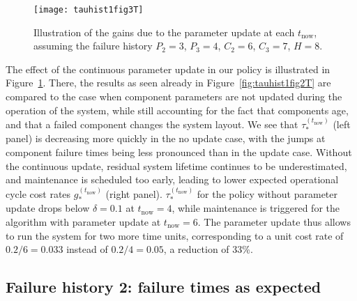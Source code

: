 \documentclass[authoryear]{elsarticle}
\def\tnow{t_\text{now}}
\newcommand{\tausnow}{\tau_*^{(\tnow)}}
\newcommand{\tstarnow}{t_*^{(\tnow)}}
\newcommand{\gstarnow}{g_*^{(\tnow)}}
\begin{document}
\begin{figure}
\texttt{[image: tauhist1fig3T]}
\caption{Illustration of the gains due to the parameter update at each $\tnow$,
assuming the failure history $P_2 = 3$, $P_3 = 4$, $C_2 = 6$, $C_3 = 7$, $H = 8$.}
\label{fig:tauhist1fig3T}
\end{figure}

The effect of the continuous parameter update in our policy is illustrated in Figure~\ref{fig:tauhist1fig3T}.
There, the results as seen already in Figure~\ref{fig:tauhist1fig2T} are compared
to the case when component parameters are not updated during the operation of the system,
while still accounting for the fact that components age,
and that a failed component changes the system layout.
We see that $\tausnow$ (left panel) is decreasing more quickly in the no update case,
with the jumps at component failure times being less pronounced than in the update case.
Without the continuous update, residual system lifetime continues to be underestimated,
and maintenance is scheduled too early,
leading to lower expected operational cycle cost rates $\gstarnow$ (right panel).
$\tausnow$ for the policy without parameter update drops below $\delta = 0.1$ at $\tnow = 4$,
while maintenance is triggered for the algorithm with parameter update at $\tnow = 6$.
The parameter update thus allows to run the system for two more time units,
corresponding to a unit cost rate of $0.2 / 6 = 0.033$ instead of $0.2 / 4 = 0.05$,
a reduction of 33\%.


\subsection{Failure history 2: failure times as expected}
\label{sec:ex-2}
\end{document}
